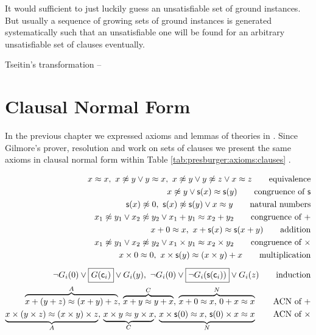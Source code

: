 It would sufficient to just luckily guess an unsatisfiable set of ground instances. 
But usually a sequence of growing sets of ground instances 
is generated systematically 
such that an unsatisfiable one will be found 
for an arbitrary unsatisfiable set of clauses
eventually.


%
%
%
Tseitin's transformation \cite{tseitin70} -- 
%
%

\section{Clausal Normal Form}\label{sec:clausal:normal:form}

In the previous chapter we expressed axioms and lemmas of theories in \FOF. 
Since Gilmore's prover, resolution and \InstGen work on sets of clauses we present
the same axioms in clausal normal form within Table 
\ref{tab:presburger:axioms:clauses} .

\begin{table}[hbt]	
	\begin{align*}
	x\mEQ x,\ 
	x\mNE y\lor y\mEQ x,\ 
	x\mNE y\lor y\mNE z\lor x\mEQ z
	\tag*{equivalence}
	\\
	x\mNE y\lor \msucc(x)\mEQ\msucc(y) 
	\tag*{congruence of $\msucc$}
	\\
	\msucc(x) \mNE 0,\ 
	\msucc(x) \mNE \msucc(y) \lor x \mEQ y
	\tag*{natural numbers}
	\\
	x_1\mNE y_1\lor x_2\mNE y_2\lor x_1+y_1 \mEQ x_2+y_2
	\tag*{congruence of $+$}
	\\
	x + 0 \mEQ x,\ 
	x+\msucc(x) \mEQ \msucc(x+y)
	\tag*{addition}
	\\
	x_1\mNE y_1\lor x_2\mNE y_2\lor x_1\times y_1 \mEQ x_2\times y_2
	\tag*{congruence of $\times$}
	\\
	x \times 0 \mEQ 0,\ 
	x \times\msucc(y) \mEQ (x\times y) + x
	\tag*{multiplication}
	\\[0.5em]
	\lnot G_i(0) \lor \boxed{G(\mc_i)} \lor G_i(y),\ 
	\lnot G_i(0) \lor \boxed{\lnot G_i(\msucc(\mc_i))} \lor G_i(z)
	\tag*{induction}
	\\
	\overbrace{x+ (y+ z) \mEQ (x+ y) + z}^{A},\,
	\overbrace{x+ y \mEQ y+ x}^{C},\, 
	\overbrace{x+ 0 \mEQ x,\, 0+ x\mEQ x}^N
	\tag*{ACN of $+$}
	\\
	\underbrace{x\times (y\times z) \mEQ (x\times y) \times z}_A,\,
	\underbrace{x\times y \mEQ y\times x}_C,\, 
	\underbrace{x\times \msucc(0) \mEQ x,\, \msucc(0)\times x\mEQ x}_N
	\tag*{ACN of $\times$}
	\end{align*}
	\caption{Clausal representation of theory axioms and lemmas}
	\label{tab:presburger:axioms:clauses}
\end{table}

